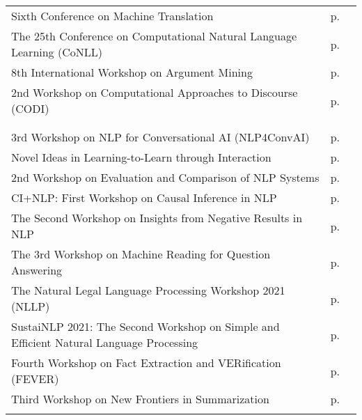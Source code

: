 \begin{center}
\renewcommand{\arraystretch}{1.1}
\vspace{-1em}
\begin{tabular}{@{}%
  >{\raggedright\arraybackslash}p{}
  >{\raggedright\arraybackslash}p{}
  >{\raggedleft\arraybackslash}p{}}


  \multicolumn{2}{l}{\hspace{-1mm}\large Wednesday--Thursday} \\  \hline
Sixth Conference on Machine Translation & p.\pageref{WShopA} \\
The 25th Conference on Computational Natural Language Learning (CoNLL) & p.\pageref{WShopB} \\
8th International Workshop on Argument Mining & p.\pageref{WShopC} \\
2nd Workshop on Computational Approaches to Discourse (CODI) & p.\pageref{WShopD} \\

  \\

  \multicolumn{2}{l}{\hspace{-1mm}\large Wednesday} \\ \hline
3rd Workshop on NLP for Conversational AI (NLP4ConvAI) & p.\pageref{WShopE} \\
Novel Ideas in Learning-to-Learn through Interaction & p.\pageref{WShopF} \\
2nd Workshop on Evaluation and Comparison of NLP Systems & p.\pageref{WShopG} \\
CI+NLP: First Workshop on Causal Inference in NLP & p.\pageref{WShopH} \\
The Second Workshop on Insights from Negative Results in NLP & p.\pageref{WShopI} \\
The 3rd Workshop on Machine Reading for Question Answering & p.\pageref{WShopJ} \\
The Natural Legal Language Processing Workshop 2021 (NLLP) & p.\pageref{WShopK} \\
SustaiNLP 2021: The Second Workshop on Simple and Efficient Natural Language Processing & p.\pageref{WShopL} \\
Fourth Workshop on Fact Extraction and VERification (FEVER) & p.\pageref{WShopM} \\
Third Workshop on New Frontiers in Summarization & p.\pageref{WShopN} \\
  \\


\end{tabular}
\end{center}
